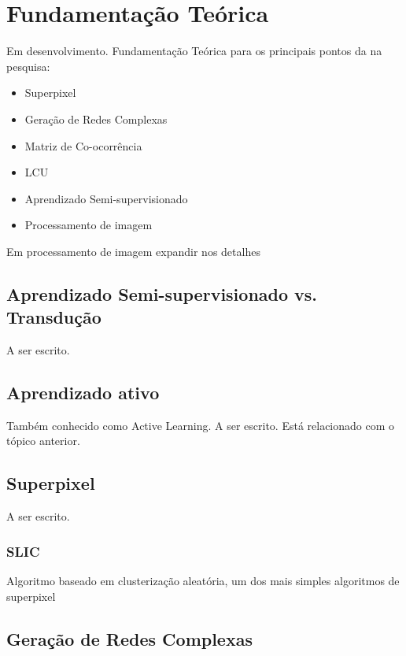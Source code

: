 \chapter{Fundamentação Teórica}\label{cap:fundamentacao-teorica}

Em desenvolvimento. Fundamentação Teórica para os principais pontos da
na pesquisa:

\begin{itemize}
\item Superpixel
\item Geração de Redes Complexas
\item Matriz de Co-ocorrência
\item \gls{LCU}
\item Aprendizado Semi-supervisionado
\item Processamento de imagem
\end{itemize}

Em processamento de imagem expandir nos detalhes


\section{Aprendizado Semi-supervisionado vs. Transdução}\label{sec:teorica-aprendizado-semi-supervisionado}

A ser escrito.

\section{Aprendizado ativo}\label{sec:teorica-aprendizado-ativo}

Também conhecido como Active Learning. A ser escrito. Está relacionado
com o tópico anterior.

\section{Superpixel}\label{sec:teorica-superpixel}

A ser escrito.

\subsection{SLIC}\label{sec:teorica-superpixel-slic}

Algoritmo baseado em clusterização aleatória, um dos mais simples
algoritmos de superpixel

\section{Geração de Redes Complexas}\label{sec:teorica-redes-complexas}

